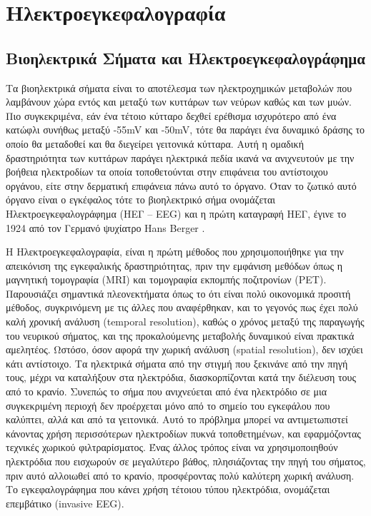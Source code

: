 \documentclass[11pt,a4paper,english,greek,twoside]{../Thesis}
\begin{document}
\chapter{Ηλεκτροεγκεφαλογραφία}
\section{Βιοηλεκτρικά Σήματα και Ηλεκτροεγκεφαλογράφημα}
\label{sec:eeg_intro}
\par Τα βιοηλεκτρικά σήματα είναι το αποτέλεσμα των ηλεκτροχημικών μεταβολών που λαμβάνουν χώρα εντός και μεταξύ των κυττάρων των νεύρων καθώς και των μυών. Πιο συγκεκριμένα, εάν ένα τέτοιο κύτταρο δεχθεί ερέθισμα ισχυρότερο από ένα κατώφλι συνήθως μεταξύ  -55mV και -50mV, τότε θα παράγει ένα δυναμικό δράσης το οποίο θα μεταδοθεί και θα διεγείρει γειτονικά κύτταρα. Αυτή η ομαδική δραστηριότητα των κυττάρων παράγει ηλεκτρικά πεδία ικανά να ανιχνευτούν με την βοήθεια ηλεκτροδίων τα οποία τοποθετούνται στην επιφάνεια του αντίστοιχου οργάνου, είτε στην δερματική επιφάνεια πάνω αυτό το όργανο. Όταν το ζωτικό αυτό όργανο είναι ο εγκέφαλος τότε το βιοηλεκτρικό σήμα ονομάζεται Ηλεκτροεγκεφαλογράφημα (ΗΕΓ – EEG) και η πρώτη καταγραφή ΗΕΓ, έγινε το 1924 από τον Γερμανό ψυχίατρο Hans Berger \cite{berger1924innervation}. 

\par Η Ηλεκτροεγκεφαλογραφία, είναι η πρώτη μέθοδος που χρησιμοποιήθηκε για την απεικόνιση της εγκεφαλικής δραστηριότητας, πριν την εμφάνιση μεθόδων όπως η μαγνητική τομογραφία (MRI) και τομογραφία εκπομπής ποζιτρονίων (PET). Παρουσιάζει σημαντικά πλεονεκτήματα όπως το ότι είναι πολύ οικονομικά προσιτή μέθοδος, συγκρινόμενη με τις άλλες που αναφέρθηκαν, και το γεγονός πως έχει πολύ καλή χρονική ανάλυση (temporal resolution), καθώς ο χρόνος μεταξύ της παραγωγής του νευρικού σήματος, και της προκαλούμενης μεταβολής δυναμικού είναι πρακτικά αμελητέος. Ωστόσο, όσον αφορά την χωρική ανάλυση (spatial resolution), δεν ισχύει κάτι αντίστοιχο. Τα ηλεκτρικά σήματα από την στιγμή που ξεκινάνε από την πηγή τους, μέχρι να καταλήξουν στα ηλεκτρόδια, διασκορπίζονται κατά την διέλευση τους από το κρανίο. Συνεπώς το σήμα που ανιχνεύεται από ένα ηλεκτρόδιο σε μια συγκεκριμένη περιοχή δεν προέρχεται μόνο από το σημείο του εγκεφάλου που καλύπτει, αλλά και από τα γειτονικά. Αυτό το πρόβλημα μπορεί να αντιμετωπιστεί κάνοντας χρήση περισσότερων ηλεκτροδίων πυκνά τοποθετημένων, και εφαρμόζοντας τεχνικές χωρικού φιλτραρίσματος. Ένας άλλος τρόπος είναι να χρησιμοποιηθούν ηλεκτρόδια που εισχωρούν σε μεγαλύτερο βάθος, πλησιάζοντας την πηγή του σήματος, πριν αυτό αλλοιωθεί από το κρανίο, προσφέροντας πολύ καλύτερη χωρική ανάλυση. Το εγκεφαλογράφημα που κάνει χρήση τέτοιου τύπου ηλεκτρόδια, ονομάζεται επεμβάτικο (invasive EEG).
\end{document}
